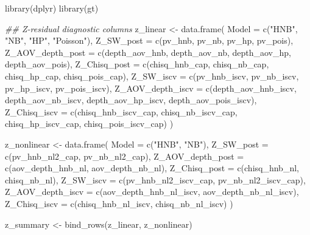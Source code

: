 \documentclass[
  english,
  letterpaper,
  DIV=11,
  numbers=noendperiod]{scrartcl}
\newenvironment{Shaded}{\begin{snugshade}}{\end{snugshade}}
\newcommand{\AttributeTok}[1]{\textcolor[rgb]{0.40,0.45,0.13}{#1}}
\newcommand{\DocumentationTok}[1]{\textcolor[rgb]{0.37,0.37,0.37}{\textit{#1}}}
\newcommand{\FunctionTok}[1]{\textcolor[rgb]{0.28,0.35,0.67}{#1}}
\newcommand{\NormalTok}[1]{\textcolor[rgb]{0.00,0.23,0.31}{#1}}
\newcommand{\OtherTok}[1]{\textcolor[rgb]{0.00,0.23,0.31}{#1}}
\newcommand{\StringTok}[1]{\textcolor[rgb]{0.13,0.47,0.30}{#1}}
\begin{document}
\begin{Shaded}
\begin{Highlighting}[]
\FunctionTok{library}\NormalTok{(dplyr)}
\FunctionTok{library}\NormalTok{(gt)}

\DocumentationTok{\#\# Z{-}residual diagnostic columns}
\NormalTok{z\_linear }\OtherTok{\textless{}{-}} \FunctionTok{data.frame}\NormalTok{(}
  \AttributeTok{Model =} \FunctionTok{c}\NormalTok{(}\StringTok{"HNB"}\NormalTok{, }\StringTok{"NB"}\NormalTok{, }\StringTok{"HP"}\NormalTok{, }\StringTok{"Poisson"}\NormalTok{),}
  \AttributeTok{Z\_SW\_post        =} \FunctionTok{c}\NormalTok{(pv\_hnb, pv\_nb, pv\_hp, pv\_pois),}
  \AttributeTok{Z\_AOV\_depth\_post =} \FunctionTok{c}\NormalTok{(depth\_aov\_hnb, depth\_aov\_nb, depth\_aov\_hp, depth\_aov\_pois),}
  \AttributeTok{Z\_Chisq\_post     =} \FunctionTok{c}\NormalTok{(chisq\_hnb\_cap, chisq\_nb\_cap, chisq\_hp\_cap, chisq\_pois\_cap),}
  \AttributeTok{Z\_SW\_iscv        =} \FunctionTok{c}\NormalTok{(pv\_hnb\_iscv, pv\_nb\_iscv, pv\_hp\_iscv, pv\_pois\_iscv),}
  \AttributeTok{Z\_AOV\_depth\_iscv =} \FunctionTok{c}\NormalTok{(depth\_aov\_hnb\_iscv, depth\_aov\_nb\_iscv, depth\_aov\_hp\_iscv, depth\_aov\_pois\_iscv),}
  \AttributeTok{Z\_Chisq\_iscv     =} \FunctionTok{c}\NormalTok{(chisq\_hnb\_iscv\_cap, chisq\_nb\_iscv\_cap, chisq\_hp\_iscv\_cap, chisq\_pois\_iscv\_cap)}
\NormalTok{)}

\NormalTok{z\_nonlinear }\OtherTok{\textless{}{-}} \FunctionTok{data.frame}\NormalTok{(}
  \AttributeTok{Model =} \FunctionTok{c}\NormalTok{(}\StringTok{"HNB"}\NormalTok{, }\StringTok{"NB"}\NormalTok{),}
  \AttributeTok{Z\_SW\_post        =} \FunctionTok{c}\NormalTok{(pv\_hnb\_nl2\_cap, pv\_nb\_nl2\_cap),}
  \AttributeTok{Z\_AOV\_depth\_post =} \FunctionTok{c}\NormalTok{(aov\_depth\_hnb\_nl, aov\_depth\_nb\_nl),}
  \AttributeTok{Z\_Chisq\_post     =} \FunctionTok{c}\NormalTok{(chisq\_hnb\_nl, chisq\_nb\_nl),}
  \AttributeTok{Z\_SW\_iscv        =} \FunctionTok{c}\NormalTok{(pv\_hnb\_nl2\_iscv\_cap, pv\_nb\_nl2\_iscv\_cap),}
  \AttributeTok{Z\_AOV\_depth\_iscv =} \FunctionTok{c}\NormalTok{(aov\_depth\_hnb\_nl\_iscv, aov\_depth\_nb\_nl\_iscv),}
  \AttributeTok{Z\_Chisq\_iscv     =} \FunctionTok{c}\NormalTok{(chisq\_hnb\_nl\_iscv, chisq\_nb\_nl\_iscv)}
\NormalTok{)}

\NormalTok{z\_summary }\OtherTok{\textless{}{-}} \FunctionTok{bind\_rows}\NormalTok{(z\_linear, z\_nonlinear)}


\end{Highlighting}
\end{Shaded}
\end{document}
